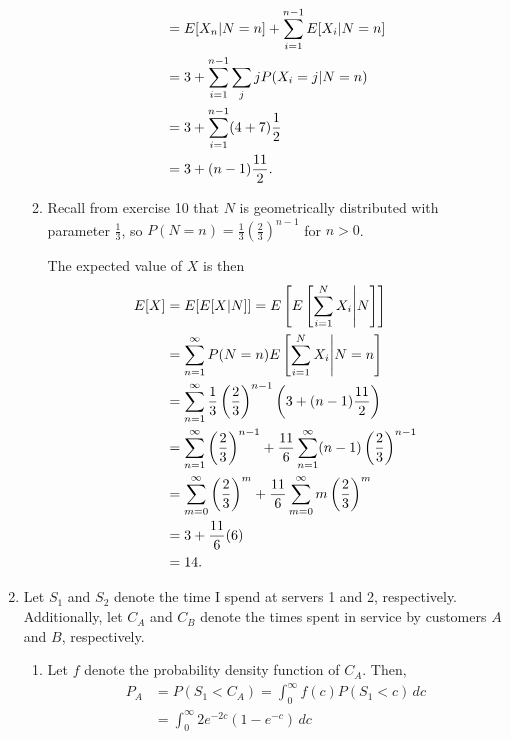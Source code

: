 \documentclass{article}
\begin{document}
\begin{enumerate}
\begin{enumerate}
\[\begin{split}
                                & = E[X_n|N=n] + \sum_{i=1}^{n-1} E[X_i|N=n] \\
                                & = 3 + \sum_{i=1}^{n-1} \sum_j j P(X_i=j|N=n) \\
                                & = 3 + \sum_{i=1}^{n-1} (4+7)\frac{1}{2} \\
                                & = 3 + (n-1)\frac{11}{2}\text. \\
        \end{split}\]
    \item
        Recall from exercise 10 that $N$ is geometrically distributed with parameter $\frac{1}{3}$, so $P(N=n)=\frac{1}{3}(\frac{2}{3})^{n-1}$ for $n>0$.

        The expected value of $X$ is then
        \[\begin{split}
        E[X]    & = E[E[X|N]] = E\left[E\left[\sum_{i=1}^NX_i\Bigg|N\right]\right] \\
                & = \sum_{n=1}^\infty P(N=n)E\left[\sum_{i=1}^NX_i\Bigg|N=n\right] \\
                & = \sum_{n=1}^\infty \frac{1}{3}\left(\frac{2}{3}\right)^{n-1} \left( 3 + (n-1)\frac{11}{2} \right) \\
                & = \sum_{n=1}^\infty \left(\frac{2}{3}\right)^{n-1} + \frac{11}{6}\sum_{n=1}^\infty (n-1)\left(\frac{2}{3}\right)^{n-1} \\
                & = \sum_{m=0}^\infty \left(\frac{2}{3}\right)^m + \frac{11}{6}\sum_{m=0}^\infty m \left(\frac{2}{3}\right)^m \\
                & = 3 + \frac{11}{6}(6) \\
                & = 14\text. \\
        \end{split}\]
    \end{enumerate}
\item
        Let $S_1$ and $S_2$ denote the time I spend at servers 1 and 2, respectively.
        Additionally, let $C_A$ and $C_B$ denote the times spent in service by customers $A$ and $B$, respectively.
    \begin{enumerate}
    \item
        Let $f$ denote the probability density function of $C_A$. Then,
        \[\begin{split}
        P_A & = P( S_1 < C_A ) = \int_0^\infty f(c) P(S_1<c)\, dc \\
            & = \int_0^\infty 2e^{-2c}(1-e^{-c})\, dc \\

\end{split}\]
\end{enumerate}
\end{enumerate}
\end{document}
